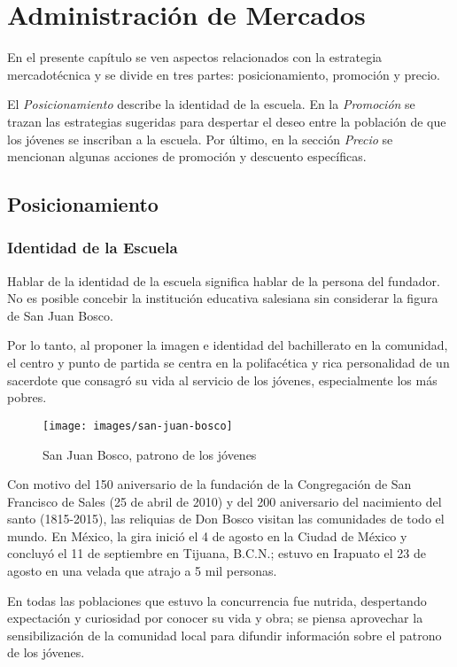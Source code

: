 \chapter{Administración de Mercados}
\label{ch:AdministracionMercados}

En el presente capítulo se ven aspectos relacionados con la estrategia mercadotécnica y se divide en tres partes: posicionamiento, promoción y precio.

El \emph{Posicionamiento} describe la identidad de la escuela. En la \emph{Promoción} se trazan las estrategias sugeridas para despertar el deseo entre la población de que los jóvenes se inscriban a la escuela. Por último, en la sección \emph{Precio} se mencionan algunas acciones de promoción y descuento específicas.

\section{Posicionamiento}

\subsection{Identidad de la Escuela}

Hablar de la identidad de la escuela significa hablar de la persona del fundador. No es posible concebir la institución educativa salesiana sin considerar la figura de San Juan Bosco.

Por lo tanto, al proponer la imagen e identidad del bachillerato en la comunidad, el centro y punto de partida se centra en la polifacética y rica personalidad de un sacerdote que consagró su vida al servicio de los jóvenes, especialmente los más pobres.

\begin{figure}
	\centering
	\texttt{[image: images/san-juan-bosco]}
	\caption{San Juan Bosco, patrono de los jóvenes}
	\label{fig:don-bosco}
\end{figure}

Con motivo del 150 aniversario de la fundación de la Congregación de San Francisco de Sales (25 de abril de 2010) y del 200 aniversario del nacimiento del santo (1815-2015), las reliquias de Don Bosco visitan las comunidades de todo el mundo. En México, la gira inició el 4 de agosto en la Ciudad de México y concluyó el 11 de septiembre en Tijuana, B.C.N.; estuvo en Irapuato el 23 de agosto en una velada que atrajo a 5 mil personas.

En todas las poblaciones que estuvo la concurrencia fue nutrida, despertando expectación y curiosidad por conocer su vida y obra; se piensa aprovechar la sensibilización de la comunidad local para difundir información sobre el patrono de los jóvenes.

